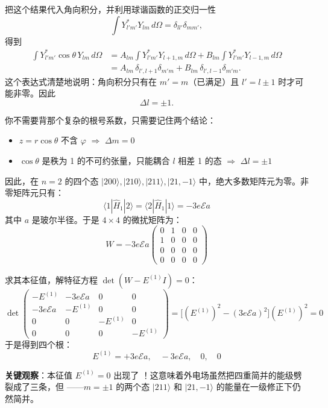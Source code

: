 \begin{modelbox}
\begin{enumerate}[nosep]
    把这个结果代入角向积分，并利用球谐函数的正交归一性
    \[
    \int Y_{l'm'}^* Y_{lm} \, d\Omega = \delta_{ll'}\delta_{mm'},
    \]
    得到
    \begin{align*}
    \int Y_{l'm'}^* \cos\theta \, Y_{lm} \, d\Omega &= A_{lm} \int Y_{l'm'}^* Y_{l+1,m} \, d\Omega + B_{lm} \int Y_{l'm'}^* Y_{l-1,m} \, d\Omega \\
    &= A_{lm} \, \delta_{l',l+1}\delta_{m'm} + B_{lm} \, \delta_{l',l-1}\delta_{m'm}.
    \end{align*}
    这个表达式清楚地说明：角向积分只有在 $m'=m$（已满足）且 $l' = l \pm 1$ 时才可能非零。因此
    \[
    \boxed{\Delta l = \pm 1}.
    \]
\end{enumerate}

\begin{tipbox}[考场速记]
你不需要背那个复杂的根号系数，只需要记住两个结论：
\begin{itemize}[nosep]
    \item $z = r\cos\theta$ 不含 $\varphi$ $\Rightarrow$ $\Delta m = 0$
    \item $\cos\theta$ 是秩为 1 的不可约张量，只能耦合 $l$ 相差 1 的态 $\Rightarrow$ $\Delta l = \pm 1$
\end{itemize}
\end{tipbox}

因此，在 $n=2$ 的四个态 $|200\rangle, |210\rangle, |211\rangle, |21,-1\rangle$ 中，绝大多数矩阵元为零。非零矩阵元只有：
\[
\langle 1|\hat{H}_1|2\rangle = \langle 2|\hat{H}_1|1\rangle = -3e\mathcal{E} a
\]
其中 $a$ 是玻尔半径。于是 $4 \times 4$ 的微扰矩阵为：
\[
W = -3e\mathcal{E} a \begin{pmatrix}
0 & 1 & 0 & 0 \\
1 & 0 & 0 & 0 \\
0 & 0 & 0 & 0 \\
0 & 0 & 0 & 0
\end{pmatrix}
\]

求其本征值，解特征方程 $\det(W - E^{(1)} I) = 0$：
\[
\det\begin{pmatrix}
-E^{(1)} & -3e\mathcal{E}a & 0 & 0 \\
-3e\mathcal{E}a & -E^{(1)} & 0 & 0 \\
0 & 0 & -E^{(1)} & 0 \\
0 & 0 & 0 & -E^{(1)}
\end{pmatrix}
= \bigl[(E^{(1)})^2 - (3e\mathcal{E}a)^2\bigr] (E^{(1)})^2 = 0
\]
于是得到四个根：
\[
\boxed{E^{(1)} = +3e\mathcal{E} a, \quad -3e\mathcal{E} a, \quad 0, \quad 0}
\]

\textbf{关键观察}：本征值 $E^{(1)} = 0$ 出现了 ！这意味着外电场虽然把四重简并的能级劈裂成了三条，但 ——$m = \pm 1$ 的两个态 $|211\rangle$ 和 $|21,-1\rangle$ 的能量在一级修正下仍然简并。


\end{modelbox}
